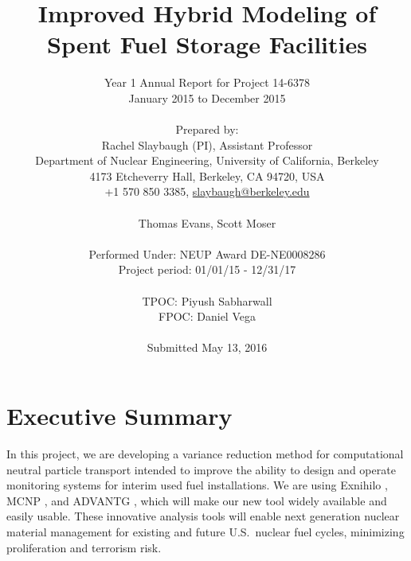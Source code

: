 \documentclass[12pt]{article}
\title{Improved Hybrid Modeling of Spent Fuel Storage Facilities}
\author{ 
  Year 1 Annual Report for Project 14-6378\\
  January 2015 to December 2015\\
  \\
  Prepared by:\\
  Rachel Slaybaugh (PI), Assistant Professor \\
  Department of Nuclear Engineering, University of California, Berkeley \\
  4173 Etcheverry Hall, Berkeley, CA 94720, USA\\
  +1 570 850 3385, 
  \href{mailto:slaybaugh@berkeley.edu}{slaybaugh@berkeley.edu}\\
  \\
  Thomas Evans, Scott Moser\\
  \\
  Performed Under: NEUP Award DE-NE0008286\\
  Project period: 01/01/15 - 12/31/17 \\
  \\
  TPOC: Piyush Sabharwall\\
  FPOC: Daniel Vega\\
  \\
  Submitted May 13, 2016
}
\begin{document}


\maketitle
\clearpage
\tableofcontents
\clearpage
%

%
\section*{Executive Summary}
\label{sect::summary}

\clearpage

In this project, we are developing a variance reduction method for computational neutral particle transport intended to improve the ability to design and operate monitoring systems for interim used fuel installations. We are using Exnihilo \cite{evans_denovo:_2010}, MCNP \cite{brown_mcnp_2002}, and ADVANTG \cite{mosher_new_2010}, which will make our new tool widely available and easily usable. These innovative analysis tools will enable next generation nuclear material management for existing and future U.S.\ nuclear fuel cycles, minimizing proliferation and terrorism risk.
\end{document}
